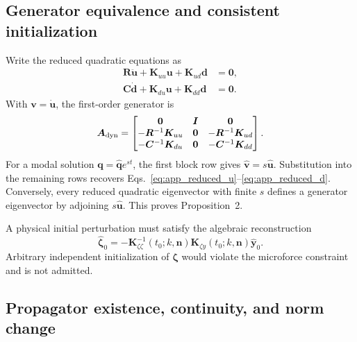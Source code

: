 \subsection{Generator equivalence and consistent initialization}

Write the reduced quadratic equations as
\begin{align}
 \boldsymbol R\ddot{\boldsymbol u}
 +\boldsymbol K_{uu}\boldsymbol u
 +\boldsymbol K_{ud}\boldsymbol d&=\boldsymbol0,
 \label{eq:app_reduced_u}\\
 \boldsymbol C\dot{\boldsymbol d}
 +\boldsymbol K_{du}\boldsymbol u
 +\boldsymbol K_{dd}\boldsymbol d&=\boldsymbol0.
 \label{eq:app_reduced_d}
\end{align}
With $\boldsymbol v=\dot{\boldsymbol u}$, the first-order generator is
\begin{equation}
 \boldsymbol A_{\rm dyn}=
 \begin{bmatrix}
  \boldsymbol0&\boldsymbol I&\boldsymbol0\\
  -\boldsymbol R^{-1}\boldsymbol K_{uu}&\boldsymbol0&
  -\boldsymbol R^{-1}\boldsymbol K_{ud}\\
  -\boldsymbol C^{-1}\boldsymbol K_{du}&\boldsymbol0&
  -\boldsymbol C^{-1}\boldsymbol K_{dd}
 \end{bmatrix}.
 \label{eq:app_generator}
\end{equation}
For a modal solution $\boldsymbol q=\widehat{\boldsymbol q}e^{st}$, the first block row gives $\widehat{\boldsymbol v}=s\widehat{\boldsymbol u}$. Substitution into the remaining rows recovers Eqs.~\eqref{eq:app_reduced_u}--\eqref{eq:app_reduced_d}. Conversely, every reduced quadratic eigenvector with finite $s$ defines a generator eigenvector by adjoining $s\widehat{\boldsymbol u}$. This proves Proposition~2.

A physical initial perturbation must satisfy the algebraic reconstruction
\begin{equation}
 \widehat{\boldsymbol\zeta}_0
 =-\boldsymbol K_{\zeta\zeta}^{-1}(t_0;k,\boldsymbol n)
   \boldsymbol K_{\zeta y}(t_0;k,\boldsymbol n)
   \widehat{\boldsymbol y}_0.
 \label{eq:app_consistent_initialization}
\end{equation}
Arbitrary independent initialization of $\boldsymbol\zeta$ would violate the microforce constraint and is not admitted.

\subsection{Propagator existence, continuity, and norm change}

